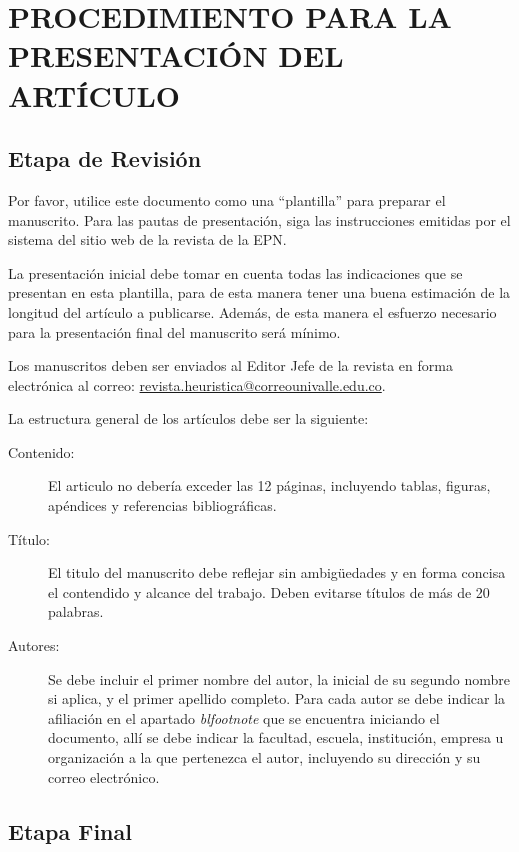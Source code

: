 \documentclass[a4paper,10pt,twoside]{article}
\begin{document}
  \section{PROCEDIMIENTO PARA LA PRESENTACIÓN DEL ARTÍCULO}
  
  \subsection{Etapa de Revisión}
  
Por favor, utilice este documento como una “plantilla” para preparar el manuscrito. Para las pautas de presentación, siga las instrucciones emitidas por el sistema del sitio web de la revista de la EPN.

La presentación inicial debe tomar en cuenta todas las indicaciones que se presentan en esta plantilla, para de esta manera tener una buena estimación de la longitud del artículo a publicarse. Además, de esta manera el esfuerzo necesario para la presentación final del manuscrito será mínimo.
  
  Los manuscritos deben ser enviados al Editor Jefe de la revista en forma electrónica al correo: \url{revista.heuristica@correounivalle.edu.co}. 
  
  La estructura general de los artículos debe ser la siguiente:
  
  \begin{description}
  \item[Contenido:] El articulo no debería exceder las 12 páginas, incluyendo tablas, figuras, apéndices y referencias bibliográficas. 
  \item[T\'itulo:] El titulo del manuscrito debe reflejar sin ambigüedades y en forma concisa el contendido y alcance del trabajo. Deben evitarse títulos de más de 20 palabras.
  \item[Autores:] Se debe incluir el primer nombre del autor,  la inicial de su segundo nombre si aplica, y el primer apellido completo. Para cada autor se debe indicar la afiliación en el apartado \emph{blfootnote} que se encuentra iniciando el documento, allí se debe indicar la facultad, escuela, institución, empresa u organización a la que pertenezca el autor, incluyendo su dirección y su correo electrónico.
   \end{description}
  
  \subsection{Etapa Final}
  
\end{document}
